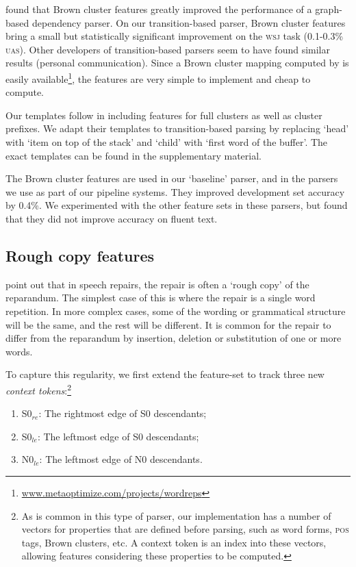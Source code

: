 \documentclass[11pt,letterpaper]{article}
\newcommand{\szero}{S0\xspace}
\newcommand{\nzero}{N0\xspace}
\newcommand{\szeroRedge}{S0$_{re}$\xspace}
\newcommand{\szeroLedge}{S0$_{le}$\xspace}
\newcommand{\nzeroLedge}{N0$_{le}$\xspace}
\begin{document}
\citet{koo:10} found that Brown cluster features greatly improved the performance
of a graph-based dependency parser. On our transition-based parser, Brown cluster
features bring a small but statistically significant improvement on the \textsc{wsj}
task (0.1-0.3\% \textsc{uas}).  Other developers of transition-based parsers
seem to have found similar results (personal communication).
Since a Brown cluster mapping computed by \citet{liang:05} is easily
available\footnote{\url{www.metaoptimize.com/projects/wordreps}}, the features
are very simple to implement and cheap to compute.

Our templates follow \citet{koo:10} in including features for full clusters as
well as cluster prefixes. We adapt their templates to transition-based parsing
by replacing `head' with `item on top of the stack' and `child' with `first word
of the buffer'. The exact templates can be found in the supplementary material.

The Brown cluster features are used in our `baseline' parser, and in the parsers
we use as part of our pipeline systems. They improved development set accuracy
by 0.4\%.  We experimented with the other feature sets in these parsers, but found
that they did not improve accuracy on fluent text.

\subsection{Rough copy features}

\citet{Johnson04a} point out that in speech repairs, the repair is often a `rough
copy' of the reparandum.  The simplest case of this is where the repair is a single
word repetition. In more complex cases, some of the wording or grammatical
structure will be the same, and the rest will be different.  
It is common for the repair to differ from the reparandum by insertion, deletion
or substitution of one or more words.

To capture this regularity, we first extend the feature-set to track three new
\emph{context tokens}:\footnote{As is common
in this type of parser, our implementation has a number of vectors for properties
that are defined before parsing, such as word forms, \textsc{pos} tags, Brown
clusters, etc. A context token is an index into these vectors, allowing
features considering these properties to be computed.}
\begin{enumerate}
    \itemsep0em
    \item \szeroRedge : The rightmost edge of \szero  descendants;
    \item \szeroLedge : The leftmost edge of \szero  descendants;
    \item \nzeroLedge : The leftmost edge of \nzero  descendants.
\end{enumerate}
\end{document}
